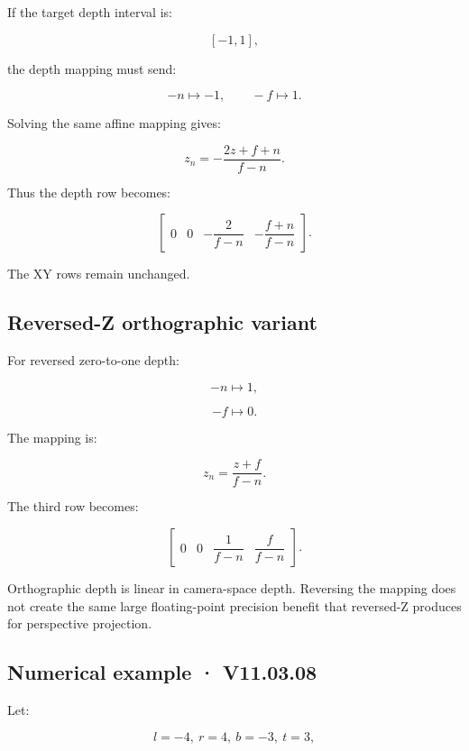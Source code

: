 \hypertarget{02-foundations-ii-ch033-opengl-default-depth-variant}{}

If the target depth interval is:

\[
 [-1,1],
\]

the depth mapping must send:

\[
 -n\mapsto-1, \qquad -f\mapsto1.
\]

Solving the same affine mapping gives:

\[
 \boxed{ z_n= -\frac{2z+f+n}{f-n} }.
\]

Thus the depth row becomes:

\[
 \begin{bmatrix} 0&0&-\dfrac2{f-n}&-\dfrac{f+n}{f-n} \end{bmatrix}.
\]

The XY rows remain unchanged.

\subsection{Reversed-Z orthographic variant}\label{02-foundations-ii-ch033-reversed-z-orthographic-variant}

\hypertarget{02-foundations-ii-ch033-reversed-z-orthographic-variant}{}

For reversed zero-to-one depth:

\[
 -n\mapsto1,
\]

\[
 -f\mapsto0.
\]

The mapping is:

\[
 \boxed{ z_n=\frac{z+f}{f-n} }.
\]

The third row becomes:

\[
 \begin{bmatrix} 0&0&\dfrac1{f-n}&\dfrac f{f-n} \end{bmatrix}.
\]

Orthographic depth is linear in camera-space depth. Reversing the mapping does not create the same large floating-point precision benefit that reversed-Z produces for perspective projection.

\subsection{Numerical example · V11.03.08}\label{02-foundations-ii-ch033-numerical-example-v11.03.08}

\hypertarget{02-foundations-ii-ch033-numerical-example-v11.03.08}{}

Let:

\[
 l=-4,\ r=4,\ b=-3,\ t=3,
\]

